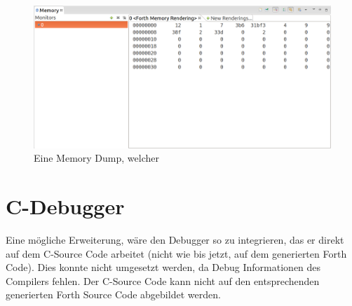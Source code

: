 \begin{figure}[H]
	\centering
		\includegraphics[scale=0.35]{debugger/dump.png}
		\caption{Eine Memory Dump, welcher}
		\label{fig:extensionpoint}
\end{figure}


\section{C-Debugger}

Eine mögliche Erweiterung, wäre den Debugger so zu integrieren, das er direkt auf dem C-Source Code arbeitet (nicht wie bis jetzt, auf dem generierten Forth Code). Dies konnte nicht umgesetzt werden, da Debug Informationen des Compilers fehlen. Der C-Source Code kann nicht auf den entsprechenden generierten Forth Source Code abgebildet werden.